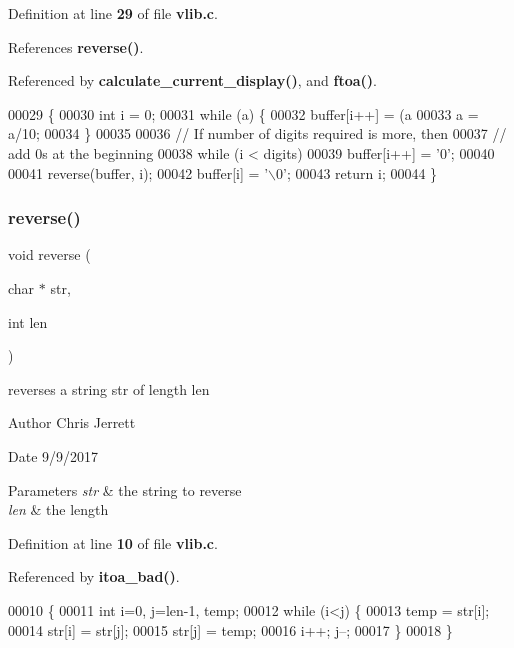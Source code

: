 Definition at line \textbf{ 29} of file \textbf{ vlib.\+c}.



References \textbf{ reverse()}.



Referenced by \textbf{ calculate\+\_\+current\+\_\+display()}, and \textbf{ ftoa()}.


\begin{DoxyCode}
00029                                               \{
00030   \textcolor{keywordtype}{int} i = 0;
00031    \textcolor{keywordflow}{while} (a) \{
00032        buffer[i++] = (a%
00033        a = a/10;
00034    \}
00035 
00036    \textcolor{comment}{// If number of digits required is more, then}
00037    \textcolor{comment}{// add 0s at the beginning}
00038    \textcolor{keywordflow}{while} (i < digits)
00039        buffer[i++] = \textcolor{charliteral}{'0'};
00040 
00041    reverse(buffer, i);
00042    buffer[i] = \textcolor{charliteral}{'\(\backslash\)0'};
00043    \textcolor{keywordflow}{return} i;
00044 \}
\end{DoxyCode}
\mbox{\label{vlib_8h_aad7fea725cb4b198ace1aa3df5051244}} 
\subsubsection{reverse()}
{\footnotesize\ttfamily void reverse (\begin{DoxyParamCaption}\item[{char $\ast$}]{str,  }\item[{int}]{len }\end{DoxyParamCaption})}



reverses a string \textquotesingle{}str\textquotesingle{} of length \textquotesingle{}len\textquotesingle{} 

\begin{DoxyAuthor}{Author}
Chris Jerrett 
\end{DoxyAuthor}
\begin{DoxyDate}{Date}
9/9/2017 
\end{DoxyDate}

\begin{DoxyParams}{Parameters}
{\em str} & the string to reverse \\
\hline
{\em len} & the length \\
\hline
\end{DoxyParams}


Definition at line \textbf{ 10} of file \textbf{ vlib.\+c}.



Referenced by \textbf{ itoa\+\_\+bad()}.


\begin{DoxyCode}
00010                                  \{
00011     \textcolor{keywordtype}{int} i=0, j=len-1, temp;
00012     \textcolor{keywordflow}{while} (i<j) \{
00013         temp = str[i];
00014         str[i] = str[j];
00015         str[j] = temp;
00016         i++; j--;
00017     \}
00018 \}
\end{DoxyCode}
